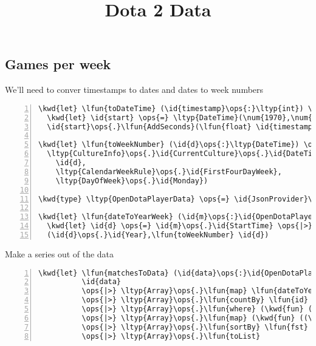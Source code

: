 \documentclass{article}
\title{Dota 2 Data}
\date{}
\newcommand{\id}[1]{\textcolor{black}{#1}}
\newcommand{\kwd}[1]{\textcolor{navy}{#1}}
\newcommand{\num}[1]{\textcolor{officegreen}{#1}}
\newcommand{\ops}[1]{\textcolor{purple}{#1}}
\newcommand{\str}[1]{\textcolor{olive}{#1}}
\begin{document}
\maketitle

\subsection*{Games per week}



We'll need to conver timestamps to dates and dates to week numbers
\begin{Verbatim}[commandchars=\\\{\}, numbers=left]
\kwd{let} \lfun{toDateTime} (\id{timestamp}\ops{:}\ltyp{int}) \ops{=}
  \kwd{let} \id{start} \ops{=} \ltyp{DateTime}(\num{1970},\num{1},\num{1},\num{0},\num{0},\num{0},\ltyp{DateTimeKind}\ops{.}\id{Utc})
  \id{start}\ops{.}\lfun{AddSeconds}(\lfun{float} \id{timestamp})\ops{.}\lfun{ToLocalTime}()

\kwd{let} \lfun{toWeekNumber} (\id{d}\ops{:}\ltyp{DateTime}) \ops{=} 
  \ltyp{CultureInfo}\ops{.}\id{CurrentCulture}\ops{.}\id{DateTimeFormat}\ops{.}\id{Calendar}\ops{.}\lfun{GetWeekOfYear}(
    \id{d},
    \ltyp{CalendarWeekRule}\ops{.}\id{FirstFourDayWeek},
    \ltyp{DayOfWeek}\ops{.}\id{Monday})

\kwd{type} \ltyp{OpenDotaPlayerData} \ops{=} \id{JsonProvider}\ops{<}\str{"https://api.opendota.com/api/players/71050296/matches"}\ops{>}

\kwd{let} \lfun{dateToYearWeek} (\id{m}\ops{:}\id{OpenDotaPlayerData}\ops{.}\id{Root}) \ops{=}
  \kwd{let} \id{d} \ops{=} \id{m}\ops{.}\id{StartTime} \ops{|>} \lfun{toDateTime}
  (\id{d}\ops{.}\id{Year},\lfun{toWeekNumber} \id{d})
\end{Verbatim}



Make a series out of the data
\begin{Verbatim}[commandchars=\\\{\}, numbers=left]
\kwd{let} \lfun{matchesToData} (\id{data}\ops{:}\id{OpenDotaPlayerData}\ops{.}\id{Root}[]) \ops{=} 
          \id{data}
          \ops{|>} \ltyp{Array}\ops{.}\lfun{map} \lfun{dateToYearWeek}
          \ops{|>} \ltyp{Array}\ops{.}\lfun{countBy} \lfun{id}
          \ops{|>} \ltyp{Array}\ops{.}\lfun{where} (\kwd{fun} ((\id{y},\_),\_) \kwd{->} (\id{y} \ops{=} \num{2019}))
          \ops{|>} \ltyp{Array}\ops{.}\lfun{map} (\kwd{fun} ((\id{y},\id{w}),\id{c}) \kwd{->} (\lfun{sprintf} \str{"}\lprf{\%i}\str{/}\lprf{\%i}\str{"} \id{y} \id{w} , \id{c}))
          \ops{|>} \ltyp{Array}\ops{.}\lfun{sortBy} \lfun{fst}
          \ops{|>} \ltyp{Array}\ops{.}\lfun{toList}
\end{Verbatim}
\end{document}
